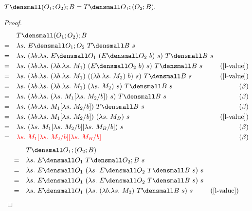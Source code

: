 \begin{lemma}
  \label{thm:templ-compose-assoc}
  $ T\den{(O_1;O_2);B} = T\den{O_1;(O_2;B)}.$
\end{lemma}
    \begin{proof}
        \begin{align*}
            &\quad T\den{(O_1;O_2);B} \\
            =& \quad \lambda s.~ E\den{O_1;O_2} ~T\den{B} ~s \\
            =& \quad \lambda s.~ (\lambda b. \lambda s.~ E\den{O_1} ~(E\den{O_2} ~b) ~s) ~T\den{B} ~s \\
            =& \quad \lambda s.~ (\lambda b. \lambda s.~ (\lambda b. \lambda s.~ M_1) ~(E\den{O_2} ~b) ~s) ~T\den{B} ~s & (\cref{l-value})\\
            =& \quad \lambda s.~ (\lambda b. \lambda s.~ (\lambda b. \lambda s.~ M_1) ~((\lambda b. \lambda s.~ M_2) ~b) ~s) ~T\den{B} ~s & (\cref{l-value})\\
            =& \quad \lambda s.~ (\lambda b. \lambda s.~ (\lambda b. \lambda s.~ M_1) ~(\lambda s.~ M_2) ~s) ~T\den{B} ~s & (\beta)\\
            =& \quad \lambda s.~ (\lambda b. \lambda s.~ (\lambda s.~ M_1\subst{b}{\lambda s.~ M_2}) ~s) ~T\den{B} ~s & (\beta)\\
            =& \quad \lambda s.~ (\lambda b. \lambda s.~ M_1\subst{b}{\lambda s.~ M_2}) ~T\den{B} ~s & (\beta)\\
            =& \quad \lambda s.~ (\lambda b. \lambda s.~ M_1\subst{b}{\lambda s.~ M_2}) ~(\lambda s.~ M_B) ~s & (\cref{l-value})\\
            =& \quad \lambda s.~ (\lambda s.~ M_1\subst{b}{\lambda s.~ M_2}\subst{b}{\lambda s.~ M_B}) ~s & (\beta)\\
            =& \quad \color{red}{\lambda s.~ M_1\subst{b}{\lambda s.~ M_2}\subst{b}{\lambda s.~ M_B}} & (\beta)
        \end{align*}
        \begin{align*}
            &\quad T\den{O_1;(O_2;B)} \\
            =& \quad \lambda s.~ E\den{O_1} ~T\den{O_2;B} ~s \\
            =& \quad \lambda s.~ E\den{O_1} ~(\lambda s. ~E\den{O_2} ~T\den{B} ~s) ~s \\
            =& \quad \lambda s.~ E\den{O_1} ~(\lambda s. ~E\den{O_2} ~T\den{B} ~s) ~s \\
            =& \quad \lambda s.~ E\den{O_1} ~(\lambda s. ~(\lambda b. \lambda s.~ M_2) ~T\den{B} ~s) ~s & (\cref{l-value})\\

\end{align*}
\end{proof}
